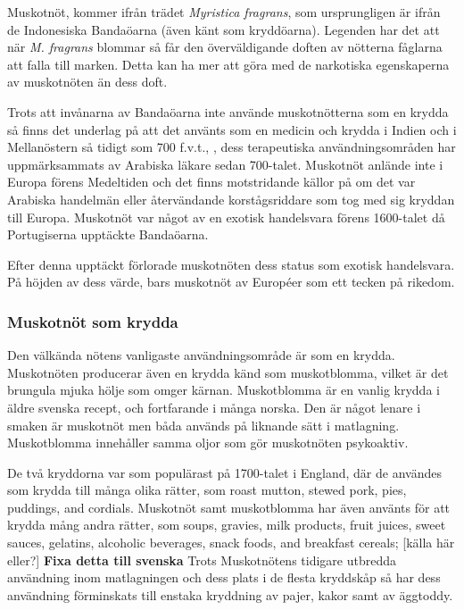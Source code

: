 Muskotnöt, kommer ifrån trädet \textit{Myristica fragrans}, som ursprungligen är ifrån de Indonesiska Bandaöarna (även känt som kryddöarna). Legenden har det att när \textit{M. fragrans} blommar så får den överväldigande doften av nötterna fåglarna att falla till marken. \cite{kreig1965green}
Detta kan ha mer att göra med de narkotiska egenskaperna av muskotnöten än dess doft.

Trots att invånarna av Bandaöarna inte använde muskotnötterna som en krydda så finns det underlag på att det använts som en medicin och krydda i Indien och i Mellanöstern så tidigt som 700 f.v.t., \cite{kalbhen1971nutmeg}, dess terapeutiska användningsområden har uppmärksammats av Arabiska läkare sedan 700-talet. \cite{weil1967nutmeg} Muskotnöt anlände inte i Europa förens Medeltiden och det finns motstridande källor på om det var Arabiska handelmän eller återvändande korstågsriddare som tog med sig kryddan till Europa. Muskotnöt var något av en exotisk handelsvara förens 1600-talet då Portugiserna upptäckte Bandaöarna.

Efter denna upptäckt förlorade muskotnöten dess status som exotisk handelsvara. På höjden av dess värde, bars muskotnöt av Européer som ett tecken på rikedom.

\subsubsection{Muskotnöt som krydda}
Den välkända nötens vanligaste användningsområde är som en krydda. Muskotnöten producerar även en krydda känd som muskotblomma, vilket är det brungula mjuka hölje som omger kärnan. Muskotblomma är en vanlig krydda i äldre svenska recept, och fortfarande i många norska. Den är något lenare i smaken är muskotnöt men båda används på liknande sätt i matlagning. Muskotblomma innehåller samma oljor som gör muskotnöten psykoaktiv. \cite{entheogenreview}

De två kryddorna var som populärast på 1700-talet i England, där de användes som krydda till många olika rätter, som
roast mutton, stewed pork, pies, puddings, and cordials. Muskotnöt samt muskotblomma
har även använts för att krydda mång andra rätter, som soups, gravies, milk products, fruit juices,
sweet sauces, gelatins, alcoholic beverages, snack foods, and breakfast cereals; [källa här eller?] \textbf{Fixa detta till svenska}
Trots Muskotnötens tidigare utbredda användning inom matlagningen och dess plats i de flesta kryddskåp så har dess användning förminskats till enstaka kryddning av pajer, kakor samt av äggtoddy. \cite{entheogenreview}


